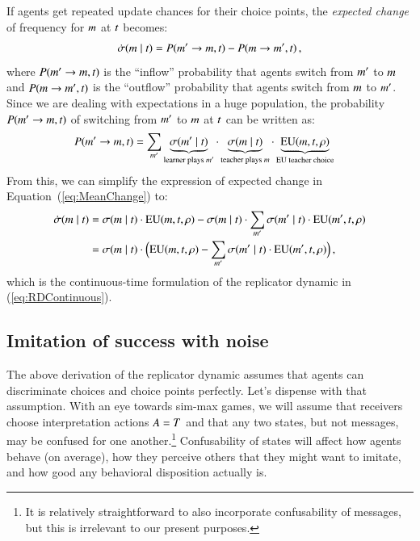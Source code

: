 \documentclass[fleqn,reqno,10pt]{article}
\begin{document}
If agents get repeated update chances for their choice points, the \emph{expected change} of
frequency for $m$ at $t$ becomes:
\begin{align}
  \label{eq:MeanChange}
  \dot{\sigma}(m \mid t) = P(m' \rightarrow m, t) - P(m \rightarrow m', t)\,,
\end{align}
where $P(m' \rightarrow m, t)$ is the ``inflow'' probability that agents switch from
$m'$ to $m$ and $P(m \rightarrow m', t)$ is the ``outflow'' probability
that agents switch from $m$ to $m'$. Since we are dealing with expectations in a huge
population, the probability $P(m' \rightarrow m, t)$ of switching from $m'$ to
$m$ at $t$ can be written as:
\begin{align*}
  P(m' \rightarrow m, t) & = \sum_{m'} \underbrace{\sigma(m' \mid
    t)}_{\text{learner plays $m'$}} \cdot
  \underbrace{\sigma(m \mid t)}_{\text{teacher plays $m$}} \cdot
  \underbrace{\mathrm{EU}(m, t, \rho)}_{\text{EU teacher choice}} 
\end{align*}
From this, we can simplify the expression of expected change in Equation~(\ref{eq:MeanChange})
to:
\begin{align*}
  \dot{\sigma}(m \mid t) & = \sigma(m \mid t) \cdot \mathrm{EU}(m,
  t, \rho) - \sigma(m \mid t) \cdot  \sum_{m'}
      \sigma(m' \mid t) \cdot \mathrm{EU}(m',t,\rho) \\
& = \sigma(m \mid t) \cdot \Big ( \mathrm{EU}(m, t,\rho) - \sum_{m'} \sigma(m' \mid t) \cdot \mathrm{EU}(m',
  t,\rho) \Big )\,,
\end{align*}
which is the continuous-time formulation of the replicator dynamic in (\ref{eq:RDContinuous}).

\subsection{Imitation of success with noise}
\label{sec:imit-succ-with}

The above derivation of the replicator dynamic assumes that agents can discriminate choices and
choice points perfectly. Let's dispense with that assumption. With an eye towards sim-max
games, we will assume that receivers choose interpretation actions $A = T$ and that
any two states, but not messages, may be confused for one another.\footnote{It is relatively
  straightforward to also incorporate confusability of messages, but this is irrelevant to our
  present purposes.} Confusability of states will affect how agents behave (on average), how
they perceive others that they might want to imitate, and how good any behavioral disposition
actually is.
\end{document}
